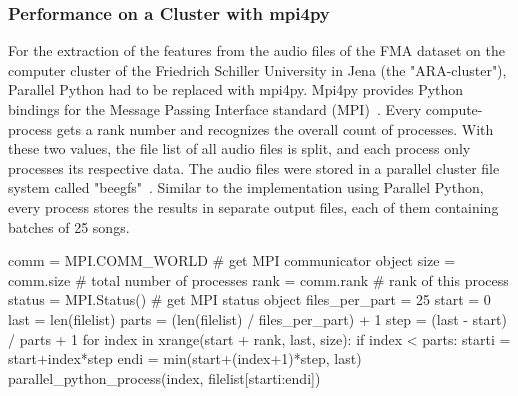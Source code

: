 \subsubsection{Performance on a Cluster with mpi4py}\label{mpi4py}

For the extraction of the features from the audio files of the FMA dataset on the computer cluster of the Friedrich Schiller University in Jena (the "ARA-cluster"), Parallel Python had to be replaced with mpi4py. 
Mpi4py provides Python bindings for the Message Passing Interface standard (MPI)~\cite{mpi4py}. 
Every compute-process gets a rank number and recognizes the overall count of processes. With these two values, the file list of all audio files is split, and each process only processes its respective data. The audio files were stored in a parallel cluster file system called "beegfs"~\cite{beegfs}. Similar to the implementation using Parallel Python, every process stores the results in separate output files, each of them containing batches of 25 songs.\\

\begin{pythonCode}[frame=single,label={lst:mpi4py},caption={Mpi4py},captionpos=b]
comm = MPI.COMM_WORLD   # get MPI communicator object
size = comm.size        # total number of processes
rank = comm.rank        # rank of this process
status = MPI.Status()   # get MPI status object
files_per_part = 25
start = 0
last = len(filelist)
parts = (len(filelist) / files_per_part) + 1
step = (last - start) / parts + 1
for index in xrange(start + rank, last, size):
    if index < parts:        
        starti = start+index*step
        endi = min(start+(index+1)*step, last)
        parallel_python_process(index, filelist[starti:endi])
\end{pythonCode}

